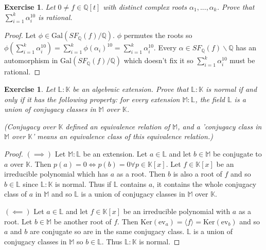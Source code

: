 \documentclass{article}
\newtheorem{exercise}[theorem]{Exercise}
\begin{document}
\begin{exercise}
Let $0\neq f\in\mathbb{Q}[t]$ with distinct complex roots $\alpha_1,...,\alpha_k$. Prove that $\sum_{i=1}^k\alpha_i^{10}$ is rational.
\end{exercise}
\begin{proof}
Let $\phi\in\text{Gal}(SF_\mathbb{Q}(f)/\mathbb{Q})$. $\phi$ permutes the roots so $\phi(\sum_{i=1}^k\alpha_i^{10})=\sum_{i=1}^k\phi(\alpha_i)^{10}=\sum_{i=1}^k\alpha_i^{10}$. Every $\alpha\in SF_\mathbb{Q}(f)\backslash\mathbb{Q}$ has an automorphism in $\text{Gal}(SF_\mathbb{Q}(f)/\mathbb{Q})$ which doesn't fix it so $\sum_{i=1}^k\alpha_i^{10}$ must be rational.
\end{proof}

\begin{exercise}
Let $\mathbb{L}:\mathbb{K}$ be an algebraic extension. Prove that $\mathbb{L}:\mathbb{K}$ is normal if and only if it has the following property: for every extension $\mathbb{M}:\mathbb{L}$, the field $\mathbb{L}$ is a union of conjugacy classes in $\mathbb{M}$ over $\mathbb{K}$.

(Conjugacy over $\mathbb{K}$ defined an equivalence relation of $\mathbb{M}$, and a 'conjugacy class in $\mathbb{M}$ over $\mathbb{K}$' means an equivalence class of this equivalence relation.)
\end{exercise}
\begin{proof}
$(\implies)$ Let $\mathbb{M}:\mathbb{L}$ be an extension. Let $a\in\mathbb{L}$ and let $b\in\mathbb{M}$ be conjugate to $a$ over $\mathbb{K}$. Then $p(a)=0\iff p(b)=0\forall p\in\mathbb{K}[x]$. Let $f\in\mathbb{K}[x]$ be an irreducible polynomial which has $a$ as a root. Then $b$ is also a root of $f$ and so $b\in\mathbb{L}$ since $\mathbb{L}:\mathbb{K}$ is normal. Thus if $\mathbb{L}$ contains $a$, it contains the whole conjugacy class of $a$ in $\mathbb{M}$ and so $\mathbb{L}$ is a union of conjugacy classes in $\mathbb{M}$ over $\mathbb{K}$.

$(\impliedby)$ Let $a\in\mathbb{L}$ and let $f\in\mathbb{K}[x]$ be an irreducible polynomial with $a$ as a root. Let $b\in\mathbb{M}$ be another root of $f$. Then $\text{Ker}(\text{ev}_a)=\langle f\rangle=\text{Ker}(\text{ev}_b)$ and so $a$ and $b$ are conjugate so are in the same conjugacy class. $\mathbb{L}$ is a union of conjugacy classes in $\mathbb{M}$ so $b\in\mathbb{L}$. Thus $\mathbb{L}:\mathbb{K}$ is normal.
\end{proof}
\end{document}
